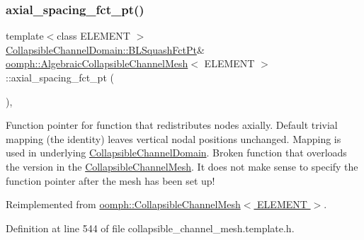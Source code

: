 \subsubsection{\texorpdfstring{axial\+\_\+spacing\+\_\+fct\+\_\+pt()}{axial\_spacing\_fct\_pt()}}
{\footnotesize\ttfamily template$<$class E\+L\+E\+M\+E\+NT $>$ \\
\hyperlink{classoomph_1_1CollapsibleChannelDomain_a2bf1d7943bfac134a5c27a54c7e1faed}{Collapsible\+Channel\+Domain\+::\+B\+L\+Squash\+Fct\+Pt}\& \hyperlink{classoomph_1_1AlgebraicCollapsibleChannelMesh}{oomph\+::\+Algebraic\+Collapsible\+Channel\+Mesh}$<$ E\+L\+E\+M\+E\+NT $>$\+::axial\+\_\+spacing\+\_\+fct\+\_\+pt (\begin{DoxyParamCaption}{ }\end{DoxyParamCaption})\hspace{0.3cm}{\ttfamily [inline]}, {\ttfamily [virtual]}}



Function pointer for function that redistributes nodes axially. Default trivial mapping (the identity) leaves vertical nodal positions unchanged. Mapping is used in underlying \hyperlink{classoomph_1_1CollapsibleChannelDomain}{Collapsible\+Channel\+Domain}. Broken function that overloads the version in the \hyperlink{classoomph_1_1CollapsibleChannelMesh}{Collapsible\+Channel\+Mesh}. It does not make sense to specify the function pointer after the mesh has been set up! 



Reimplemented from \hyperlink{classoomph_1_1CollapsibleChannelMesh_ac7913dca6b8b11240caede54414f3c11}{oomph\+::\+Collapsible\+Channel\+Mesh$<$ E\+L\+E\+M\+E\+N\+T $>$}.



Definition at line 544 of file collapsible\+\_\+channel\+\_\+mesh.\+template.\+h.

\mbox{\label{classoomph_1_1AlgebraicCollapsibleChannelMesh_abf1848b49f57419af4379a637464587d}} 
